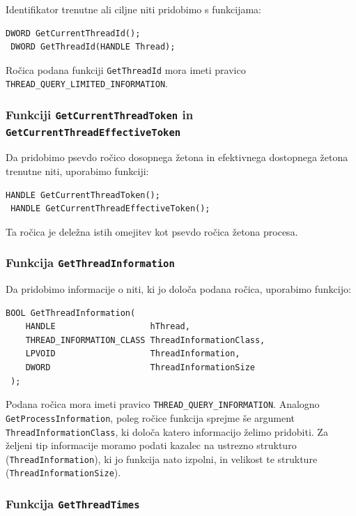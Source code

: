 \documentclass[a4paper,12pt,openright]{book}
\begin{document}
Identifikator trenutne ali ciljne niti pridobimo s funkcijama:
\begin{lstlisting}[style=func]
 DWORD GetCurrentThreadId();
 DWORD GetThreadId(HANDLE Thread);
\end{lstlisting}

Ročica podana funkciji \texttt{GetThreadId} mora imeti pravico \texttt{THREAD\_QUERY\-\_LIMITED\-\_INFORMATION}.

\subsubsection{Funkciji \texttt{GetCurrentThreadToken} in \texttt{GetCurrentThreadEffectiveToken}}

Da pridobimo psevdo ročico dosopnega žetona in efektivnega dostopnega žetona trenutne niti, uporabimo funkciji:
\begin{lstlisting}[style=func]
 HANDLE GetCurrentThreadToken();
 HANDLE GetCurrentThreadEffectiveToken();
\end{lstlisting}

Ta ročica je deležna istih omejitev kot psevdo ročica žetona procesa.

\subsubsection{Funkcija \texttt{GetThreadInformation}}

Da pridobimo informacije o niti, ki jo določa podana ročica, uporabimo funkcijo:
\begin{lstlisting}[style=func]
 BOOL GetThreadInformation(
	HANDLE                   hThread,
	THREAD_INFORMATION_CLASS ThreadInformationClass,
	LPVOID                   ThreadInformation,
	DWORD                    ThreadInformationSize
 );
\end{lstlisting}

Podana ročica mora imeti pravico \texttt{THREAD\-\_QUERY\_INFORMATION}.
Analogno \texttt{GetProcessInformation}, poleg ročice funkcija sprejme še argument \texttt{ThreadInformationClass}, ki določa katero informacijo želimo pridobiti.
Za željeni tip informacije moramo podati kazalec na ustrezno strukturo (\texttt{ThreadInformation}), ki jo funkcija nato izpolni, in velikost te strukture (\texttt{ThreadInformationSize}).

\subsubsection{Funkcija \texttt{GetThreadTimes}}
\end{document}
